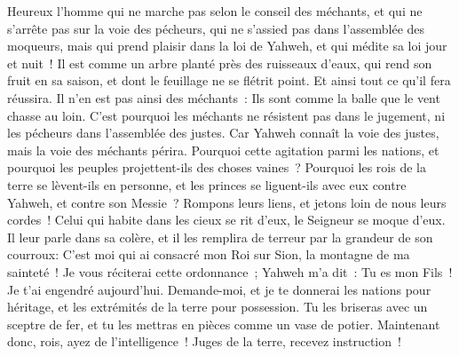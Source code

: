 \begin{multicols}{2}
\VerseOne{}Heureux l'homme qui ne marche pas selon le conseil des méchants, et qui ne s'arrête pas sur la voie des pécheurs, qui ne s'assied pas dans l'assemblée des moqueurs,
mais qui prend plaisir dans la loi de Yahweh, et qui médite sa loi jour et nuit~!
Il est comme un arbre planté près des ruisseaux d'eaux, qui rend son fruit en sa saison, et dont le feuillage ne se flétrit point. Et ainsi tout ce qu'il fera réussira.
Il n'en est pas ainsi des méchants~: Ils sont comme la balle que le vent chasse au loin.
C'est pourquoi les méchants ne résistent pas dans le jugement, ni les pécheurs dans l'assemblée des justes.
Car Yahweh connaît la voie des justes, mais la voie des méchants périra.
\VerseOne{}Pourquoi cette agitation parmi les nations, et pourquoi les peuples projettent-ils des choses vaines~?
Pourquoi les rois de la terre se lèvent-ils en personne, et les princes se liguent-ils avec eux contre Yahweh, et contre son Messie~?
Rompons leurs liens, et jetons loin de nous leurs cordes~!
Celui qui habite dans les cieux se rit d'eux, le Seigneur se moque d'eux.
Il leur parle dans sa colère, et il les remplira de terreur par la grandeur de son courroux:
C'est moi qui ai consacré mon Roi sur Sion, la montagne de ma sainteté~!
Je vous réciterai cette ordonnance~; Yahweh m'a dit~: Tu es mon Fils~! Je t'ai engendré aujourd'hui.
Demande-moi, et je te donnerai les nations pour héritage, et les extrémités de la terre pour possession.
Tu les briseras avec un sceptre de fer, et tu les mettras en pièces comme un vase de potier.
Maintenant donc, rois, ayez de l'intelligence~! Juges de la terre, recevez instruction~!

\end{multicols}
